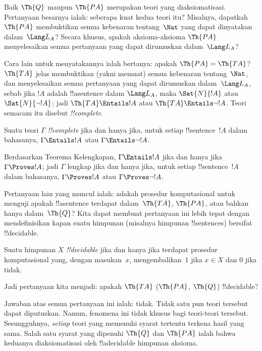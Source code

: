 \documentclass[../../../include/open-logic-section]{subfiles}
\begin{document}
Baik $\Th{Q}$ maupun $\Th{PA}$ merupakan teori yang diaksiomatisasi.
Pertanyaan besarnya ialah: seberapa kuat kedua teori itu? Misalnya, dapatkah
$\Th{PA}$ membuktikan semua kebenaran tentang~$\Nat$ yang dapat dinyatakan
dalam~$\Lang L_A$? Secara khusus, apakah aksioma-aksioma $\Th{PA}$
menyelesaikan semua pertanyaan yang dapat dirumuskan dalam~$\Lang L_A$?

Cara lain untuk menyatakannya ialah bertanya: apakah $\Th{PA} = \Th{TA}$?
$\Th{TA}$ jelas membuktikan (yakni memuat) semua kebenaran tentang~$\Nat$,
dan menyelesaikan semua pertanyaan yang dapat dirumuskan dalam~$\Lang L_A$,
sebab jika $!A$ adalah !!a{sentence} dalam $\Lang L_A$, maka
$\Sat{N}{!A}$ atau $\Sat{N}{\lnot !A}$; jadi $\Th{TA} \Entails !A$ atau
$\Th{TA} \Entails \lnot !A$. Teori semacam itu disebut
\emph{!!{complete}}.

\begin{defn}
Suatu teori $\Gamma$ \emph{!!{complete}} jika dan hanya jika, untuk setiap
!!{sentence}~$!A$ dalam bahasanya, $\Gamma \Entails !A$ atau $\Gamma
\Entails \lnot !A$.
\end{defn}

\begin{explain}
Berdasarkan Teorema Kelengkapan, $\Gamma \Entails !A$ jika dan hanya jika
$\Gamma \Proves !A$; jadi $\Gamma$ lengkap jika dan hanya jika, untuk setiap
!!{sentence}~$!A$ dalam bahasanya, $\Gamma \Proves !A$ atau $\Gamma
\Proves \lnot !A$.
\end{explain}

Pertanyaan lain yang muncul ialah: adakah prosedur komputasional untuk
menguji apakah !!a{sentence} terdapat dalam~$\Th{TA}$, $\Th{PA}$, atau
bahkan hanya dalam~$\Th{Q}$? Kita dapat membuat pertanyaan ini lebih tepat
dengan mendefinisikan kapan suatu himpunan (misalnya himpunan !!{sentence}s)
bersifat !!{decidable}.

\begin{defn}
Suatu himpunan $X$ \emph{!!{decidable}} jika dan hanya jika terdapat prosedur
komputasional yang, dengan masukan~$x$, mengembalikan~$1$ jika $x \in X$ dan
$0$ jika tidak.
\end{defn}

Jadi pertanyaan kita menjadi: apakah $\Th{TA}$ ($\Th{PA}$, $\Th{Q}$)
!!{decidable}?

Jawaban atas semua pertanyaan ini ialah: tidak. Tidak satu pun teori tersebut
dapat diputuskan. Namun, fenomena ini tidak khusus bagi teori-teori tersebut.
Sesungguhnya, \emph{setiap} teori yang memenuhi syarat tertentu terkena hasil
yang sama. Salah satu syarat yang dipenuhi $\Th{Q}$ dan $\Th{PA}$ ialah
bahwa keduanya diaksiomatisasi oleh !!a{decidable} himpunan aksioma.
\end{document}
